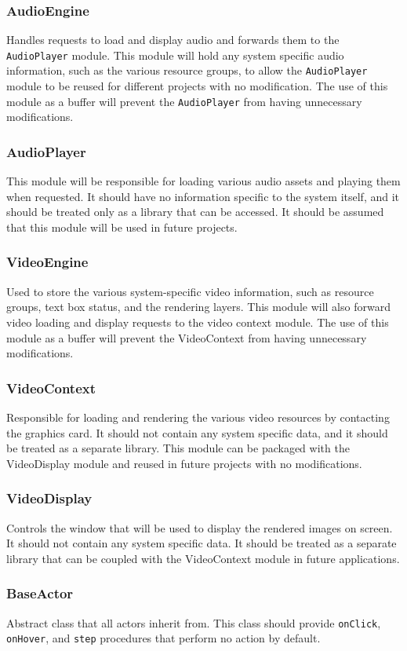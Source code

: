\documentclass{article}
\begin{document}
    \subsubsection{AudioEngine}
      Handles requests to load and display audio and forwards them to the \texttt{AudioPlayer} module. This module will hold any system specific audio information, such as the various resource groups, to allow the \texttt{AudioPlayer} module to be reused for different projects with no modification. The use of this module as a buffer will prevent the \texttt{AudioPlayer} from having unnecessary modifications.
    \subsubsection{AudioPlayer}
      This module will be responsible for loading various audio assets and playing them when requested. It should have no information specific to the system itself, and it should be treated only as a library that can be accessed. It should be assumed that this module will be used in future projects.
    \subsubsection{VideoEngine}
      Used to store the various system-specific video information, such as resource groups, text box status, and the rendering layers. This module will also forward video loading and display requests to the video context module. The use of this module as a buffer will prevent the VideoContext from having unnecessary modifications.
    \subsubsection{VideoContext}
      Responsible for loading and rendering the various video resources by contacting the graphics card. It should not contain any system specific data, and it should be treated as a separate library. This module can be packaged with the VideoDisplay module and reused in future projects with no modifications.
    \subsubsection{VideoDisplay}
      Controls the window that will be used to display the rendered images on screen. It should not contain any system specific data. It should be treated as a separate library that can be coupled with the VideoContext module in future applications.
    \subsubsection{BaseActor}
    Abstract class that all actors inherit from. This class should provide \texttt{onClick}, \texttt{onHover}, and \texttt{step} procedures that perform no action by default.
\end{document}
